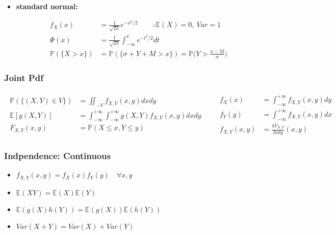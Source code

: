 \documentclass[10pt]{article}
\begin{document}
\begin{multicols}{2}
\begin{itemize}
\item \textbf{standard normal:}

  \begin{equation*}
    \boxed{
      \begin{aligned}
        f_X(x) &= \frac{1}{\sqrt{2\pi}} e^{-x^2/2} \qquad 
        \therefore \mathbb{E}(X)=0, \ Var=1 \\
        \Phi(x) &= \frac{1}{\sqrt{2\pi}} \int_{-\infty}^x e^{-t^2/2} dt \\
        \mathbb{P}(\{X>x\}) &= \mathbb{P}(\{\sigma + Y + M > x\}) =
        \mathbb{P}\Big(Y>\frac{x-M}{\sigma}\Big)
      \end{aligned}
    }
  \end{equation*}
\end{itemize}
\end{multicols}

\subsubsection*{Joint Pdf}

\begin{equation*}
  \boxed{
    \begin{aligned}
      \begin{aligned}
        \mathbb{P}(\{(X,Y)\in V\}) &= \iint_{-V} f_{X,Y}(x,y) dx dy \\
        \mathbb{E}[g(X,Y)] &= \int_{-\infty}^{+\infty}
        \int_{-\infty}^{+\infty} g(X,Y) f_{X,Y}(x,y) dx dy \\
        F_{X,Y}(x,y) &= \mathbb{P}(X\leq x, Y\leq y)
      \end{aligned} \quad &
      \begin{aligned}
        f_X(x) &= \int_{-\infty}^{+\infty} f_{X,Y}(x,y) dy \\
        f_Y(y) &= \int_{-\infty}^{+\infty} f_{X,Y}(x,y) dx \\
        f_{X,Y}(x,y) &= \frac{\delta F_{X,Y}} {\delta x\delta y}(x,y)
      \end{aligned}
    \end{aligned}
  }
\end{equation*}

\subsubsection*{Indpendence: Continuous}

\begin{multicols}{2}
\begin{itemize}
\item $f_{X,Y}(x,y) = f_X(x)f_Y(y) \quad \forall x, y$
\item $\mathbb{E}(XY) = \mathbb{E}(X)\mathbb{E}(Y)$
\item $\mathbb{E}(g(X)h(Y)) = \mathbb{E}(g(X))\mathbb{E}(h(Y))$
\item $Var(X+Y) = Var(X)+Var(Y)$
\end{itemize}
\end{multicols}
\end{document}
